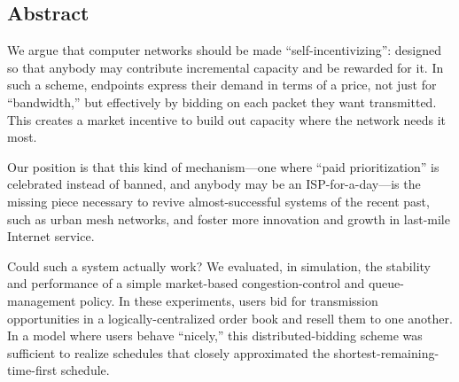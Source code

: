 \subsection*{Abstract}
We argue that computer networks should be made ``self-incentivizing'':
designed so that anybody may contribute incremental capacity and be
rewarded for it. In such a scheme, endpoints express their demand in
terms of a price, not just for ``bandwidth,'' but effectively by
bidding on each packet they want transmitted. This creates a market
incentive to build out capacity where the network needs it most.

Our position is that this kind of mechanism---one where ``paid
prioritization'' is celebrated instead of banned, and anybody may be an
ISP-for-a-day---is the missing piece necessary to revive
almost-successful systems of the recent past, such as urban mesh
networks, and foster more innovation and growth in last-mile Internet service.

Could such a system actually work? We evaluated, in simulation, the
stability and performance of a simple market-based congestion-control and queue-management
policy. In these experiments, users bid for
transmission opportunities in a logically-centralized order book and
resell them to one another. In a model where users behave ``nicely,''
this distributed-bidding scheme was sufficient to realize schedules
that closely approximated the shortest-remaining-time-first
schedule.
